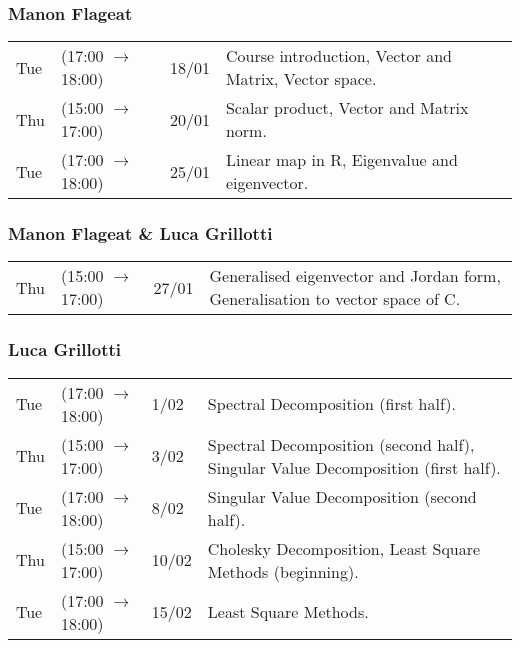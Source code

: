 \documentclass{report}
\begin{document}
\subsubsection*{Manon Flageat}
\begin{center}
	\begin{tabular}{l l l p{}}
		Tue & (17:00 $\to$ 18:00) & 18/01 & Course introduction, Vector and Matrix, Vector space. \\
		Thu & (15:00 $\to$ 17:00) & 20/01 & Scalar product, Vector and Matrix norm.               \\
		Tue & (17:00 $\to$ 18:00) & 25/01 & Linear map in R, Eigenvalue and eigenvector.          \\
	\end{tabular}
\end{center}
\subsubsection*{Manon Flageat \& Luca Grillotti}
\begin{center}
	\begin{tabular}{l l l p{}}
		Thu & (15:00 $\to$ 17:00) & 27/01 & Generalised eigenvector and Jordan form, Generalisation to vector space of C. \\
	\end{tabular}
\end{center}
\subsubsection*{Luca Grillotti}
\begin{center}
	\begin{tabular}{l l l p{}}
		Tue & (17:00 $\to$ 18:00) & 1/02  & Spectral Decomposition (first half).                                             \\
		Thu & (15:00 $\to$ 17:00) & 3/02  & Spectral Decomposition (second half), Singular Value Decomposition (first half). \\
		Tue & (17:00 $\to$ 18:00) & 8/02  & Singular Value Decomposition (second half).                                      \\
		Thu & (15:00 $\to$ 17:00) & 10/02 & Cholesky Decomposition, Least Square Methods (beginning).                        \\
		Tue & (17:00 $\to$ 18:00) & 15/02 & Least Square Methods.                                                            \\
	\end{tabular}
\end{center}
\end{document}
